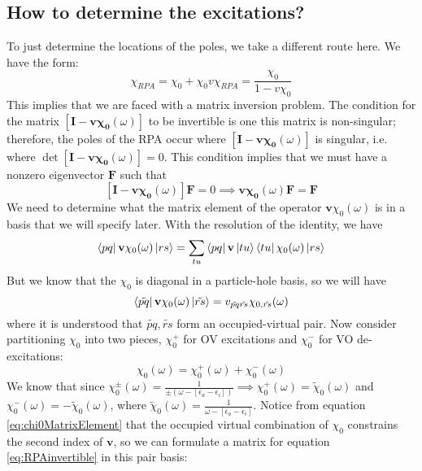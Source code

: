 \documentclass[12pt]{article}
\begin{document}
\subsection{How to determine the excitations?}
To just determine the locations of the poles, we take a different route here.
We have the form:
\begin{equation}
    \chi_{RPA} = \chi_0 + \chi_0 v \chi_{RPA} = \frac{\chi_0}{1 - v \chi_0}
\end{equation}
This implies that we are faced with a matrix inversion problem. The condition for the matrix $\left[\mathbf{I} - \mathbf{v}\mathbf{\chi_0}(\omega )\right]$ to be invertible is one this matrix is non-singular; therefore, the poles of the RPA occur where $\left[\mathbf{I} - \mathbf{v}\mathbf{\chi_0}(\omega )\right]$ is singular, i.e. where $\det\left[\mathbf{I} - \mathbf{v}\mathbf{\chi_0}(\omega )\right] = 0$. This condition implies that we must have a nonzero eigenvector $\mathbf{F}$ such that
\begin{equation}
    \left[\mathbf{I} - \mathbf{v}\mathbf{\chi_0}(\omega )\right]\mathbf{F} = 0 \implies \mathbf{v}\mathbf{\chi_0}(\omega )\mathbf{F} = \mathbf{F}
\label{eq:RPAinvertible}
\end{equation}
We need to determine what the matrix element of the operator $\mathbf{v}\chi_0(\omega)$ is in a basis that we will specify later. With the resolution of the identity, we have
\begin{equation}
    \bra{pq} \mathbf{v}\chi_0(\omega) \ket{rs} = \sum_{tu} \bra{pq} \mathbf{v} \ket{tu} \bra{tu} \chi_0(\omega) \ket{rs}
\end{equation}
But we know that the $\chi_0$ is diagonal in a particle-hole basis, so we will have
\begin{equation}
    \bra{\tilde{pq}} \mathbf{v}\chi_0(\omega) \ket{\tilde{rs}} = v_{\tilde{pq}\tilde{rs}} \chi_{0,\tilde{rs}}(\omega)
\label{eq:chi0MatrixElement}
\end{equation}
where it is understood that $\tilde{pq}, \tilde{rs}$ form an occupied-virtual pair. Now consider partitioning $\chi_0$ into two pieces, $\chi_0^{+}$ for OV excitations and $\chi_0^{-}$ for VO de-excitations:
\begin{equation}
    \chi_0(\omega) = \chi_{0}^{+}(\omega) + \chi_{0}^{-}(\omega)
\end{equation}
We know that since $\chi_{0}^{\pm}\left(\omega\right) = \frac{1}{\pm \left(\omega - \left[\epsilon_{a}-\epsilon_{i}\right]\right)}\implies \chi_{0}^{+}\left(\omega\right) = \tilde{\chi}_{0}(\omega)$ and $\chi_{0}^{-}\left(\omega\right) = -\tilde{\chi}_{0}(\omega)$, where $\tilde{\chi}_{0}(\omega)= \frac{1}{\omega - \left[\epsilon_{a}-\epsilon_{i}\right]}$. Notice from equation \ref{eq:chi0MatrixElement} that the occupied virtual combination of $\chi_0$ constrains the second index of $\mathbf{v}$, so we can formulate a matrix for equation \ref{eq:RPAinvertible} in this pair basis:
\end{document}
